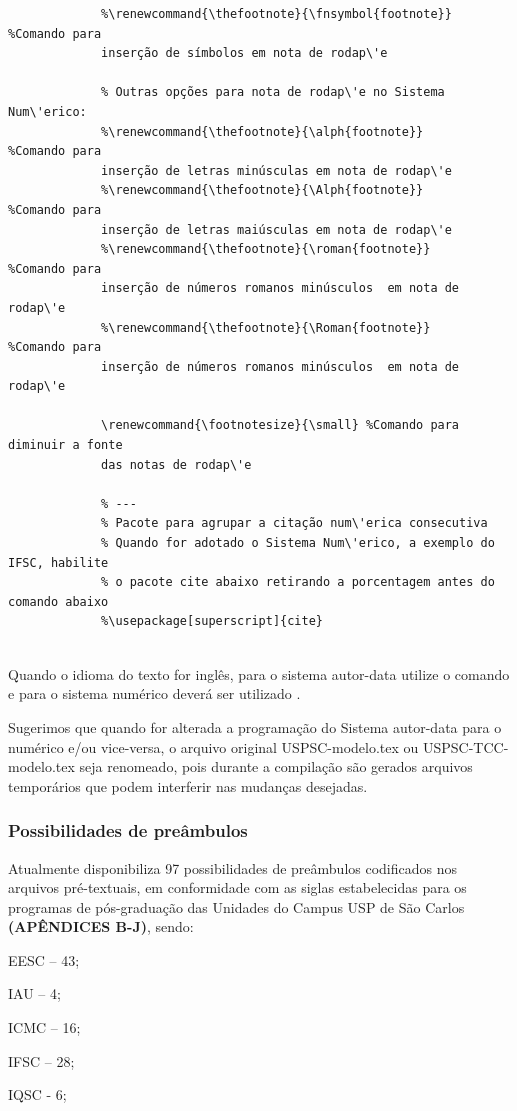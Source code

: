 \begin{verbatim}
			 %\renewcommand{\thefootnote}{\fnsymbol{footnote}} %Comando para 
			 inserção de símbolos em nota de rodap\'e
			  
			 % Outras opções para nota de rodap\'e no Sistema Num\'erico:
			 %\renewcommand{\thefootnote}{\alph{footnote}}     %Comando para 
			 inserção de letras minúsculas em nota de rodap\'e
			 %\renewcommand{\thefootnote}{\Alph{footnote}}     %Comando para 
			 inserção de letras maiúsculas em nota de rodap\'e
			 %\renewcommand{\thefootnote}{\roman{footnote}}    %Comando para 
			 inserção de números romanos minúsculos  em nota de rodap\'e
			 %\renewcommand{\thefootnote}{\Roman{footnote}}    %Comando para 
			 inserção de números romanos minúsculos  em nota de rodap\'e
			  
			 \renewcommand{\footnotesize}{\small} %Comando para diminuir a fonte 
			 das notas de rodap\'e	
			  
			 % ---
			 % Pacote para agrupar a citação num\'erica consecutiva
			 % Quando for adotado o Sistema Num\'erico, a exemplo do IFSC, habilite 
			 % o pacote cite abaixo retirando a porcentagem antes do comando abaixo
			 %\usepackage[superscript]{cite}
			  			  	
			 \end{verbatim}

Quando o idioma do texto for ingl\^es, para o sistema autor-data utilize o comando \verb++ e para o sistema num\'erico dever\'a ser utilizado \verb++.

Sugerimos que quando for alterada a programação do Sistema autor-data para o num\'erico e/ou vice-versa, o arquivo original USPSC-modelo.tex ou USPSC-TCC-modelo.tex seja renomeado, pois durante a compilação são gerados arquivos tempor\'arios que podem interferir nas mudanças desejadas.			 

\subsubsection{Possibilidades de pre\^ambulos}

Atualmente disponibiliza 97 possibilidades de pre\^ambulos codificados nos arquivos pr\'e-textuais, em conformidade com as siglas estabelecidas para os programas de pós-graduação das Unidades do Campus USP de São Carlos \textbf{(APÊNDICES B-J)}, sendo:
	
				  
			   \begin{alineas}
			   	\item EESC – 43;
				\item IAU – 4;
				\item  ICMC – 16;
				\item  IFSC – 28;
				\item  IQSC - 6;
			  \end{alineas}	
			  

